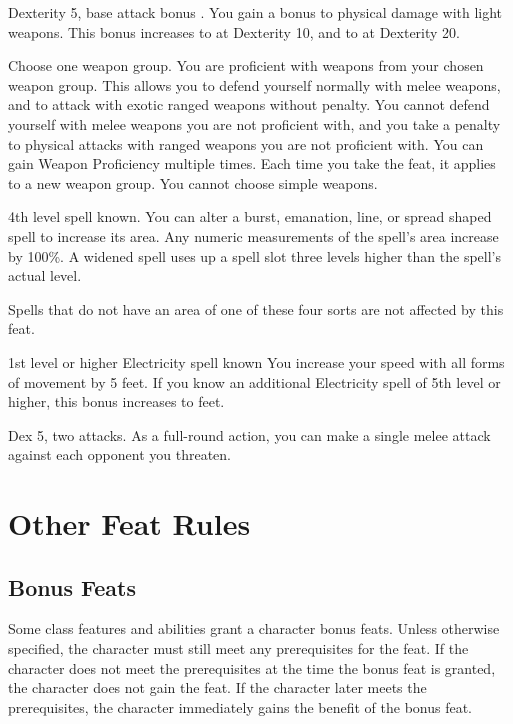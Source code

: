 \featpres Dexterity 5, base attack bonus .
\featben You gain a  bonus to physical damage with light weapons.
This bonus increases to  at Dexterity 10, and to  at Dexterity 20.

Choose one weapon group.
\featben You are proficient with weapons from your chosen weapon group.
This allows you to defend yourself normally with melee weapons, and to attack with exotic ranged weapons without penalty.
You cannot defend yourself with melee weapons you are not proficient with, and you take a  penalty to physical attacks with ranged weapons you are not proficient with.
You can gain Weapon Proficiency multiple times.
Each time you take the feat, it applies to a new weapon group.
You cannot choose simple weapons.

\featpre 4th level spell known.
\featben You can alter a burst, emanation, line, or spread shaped spell to increase its area.
Any numeric measurements of the spell's area increase by 100\%.
A widened spell uses up a spell slot three levels higher than the spell's actual level.
\par Spells that do not have an area of one of these four sorts are not affected by this feat.

\featpre 1st level or higher Electricity spell known
\featben You increase your speed with all forms of movement by 5 feet.
If you know an additional Electricity spell of 5th level or higher, this bonus increases to  feet.

\featpres Dex 5, two attacks.
\featben As a full-round action, you can make a single melee attack against each opponent you threaten.

\section{Other Feat Rules}

\subsection{Bonus Feats}
Some class features and abilities grant a character bonus feats.
Unless otherwise specified, the character must still meet any prerequisites for the feat.
If the character does not meet the prerequisites at the time the bonus feat is granted, the character does not gain the feat.
If the character later meets the prerequisites, the character immediately gains the benefit of the bonus feat.

